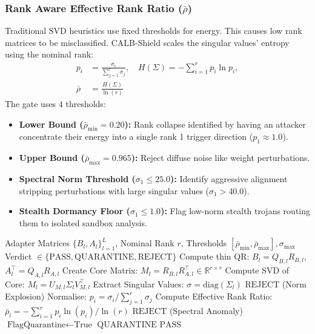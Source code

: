 \subsubsection{Rank Aware Effective Rank Ratio \texorpdfstring{($\bar{\rho}$)}{(rho)}}
Traditional SVD heuristics use fixed thresholds for energy. This causes low rank matrices to be misclassified. CALB-Shield scales the singular values' entropy using the nominal rank:
\begin{align}
p_i &= \frac{\sigma_i}{\sum_{j=1}^r \sigma_j}, \quad H(\Sigma) = -\sum_{i=1}^r p_i \ln p_i, \nonumber \\
\bar{\rho} &= \frac{H(\Sigma)}{\ln(r)}
\end{align}
The gate uses 4 thresholds:
\begin{itemize}
    \item \textbf{Lower Bound ($\bar{\rho}_{\min} = 0.20$):} Rank collapse identified by having an attacker concentrate their energy into a single rank 1 trigger direction ($p_1 \approx 1.0$).
    \item \textbf{Upper Bound ($\bar{\rho}_{\max} = 0.965$):} Reject diffuse noise like weight perturbations.
    \item \textbf{Spectral Norm Threshold ($\sigma_1 \le 25.0$):} Identify aggressive alignment stripping perturbations with large singular values ($\sigma_1 > 40.0$).
    \item \textbf{Stealth Dormancy Floor ($\sigma_1 \le 1.0$):} Flag low-norm stealth trojans routing them to isolated sandbox analysis.
\end{itemize}

\begin{algorithm}[t]
\caption{Fast QR-SVD Spectral Check and Rank Bounds}
\label{alg:qr_svd}
\begin{algorithmic}[1]
\REQUIRE Adapter Matrices $\{B_l, A_l\}_{l=1}^L$, Nominal Rank $r$, Thresholds $[\bar{\rho}_{\min}, \bar{\rho}_{\max}], \sigma_{\max}$
\ENSURE Verdict $\in \{\text{PASS}, \text{QUARANTINE}, \text{REJECT}\}$
    \STATE Compute thin QR: $B_l = Q_{B,l} R_{B,l}$, $A_l^\top = Q_{A,l} R_{A,l}$
    \STATE Create Core Matrix: $M_l = R_{B,l} R_{A,l}^\top \in \mathbb{R}^{r \times r}$
    \STATE Compute SVD of Core: $M_l = U_{M,l} \Sigma_l V_{M,l}^\top$
    \STATE Extract Singular Values: $\sigma = \text{diag}(\Sigma_l)$
        \RETURN $\text{REJECT}$ (Norm Explosion)
    \ENDIF
    \STATE Normalise: $p_i = \sigma_i / \sum_{j=1}^r \sigma_j$
    \STATE Compute Effective Rank Ratio: $\bar{\rho}_l = -\sum_{i=1}^r p_i \ln(p_i) / \ln(r)$
        \RETURN $\text{REJECT}$ (Spectral Anomaly)
    \ENDIF
        \STATE $\text{FlagQuarantine} \leftarrow \text{True}$
    \ENDIF
\ENDFOR
{}
    \RETURN $\text{QUARANTINE}$
\ENDIF
\RETURN $\text{PASS}$
\end{algorithmic}
\end{algorithm}

